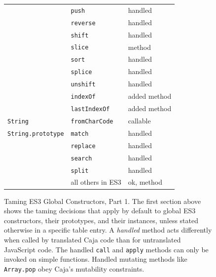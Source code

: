 \documentclass[letterpaper,twocolumn,10pt]{article}
\newcommand{\code}[1]{{\tt {#1}}}              %
\begin{document}
\begin{figure}
\begin{tabular}{lll}
                                 & \code{push}                 & handled \\
                                 & \code{reverse}              & handled \\
                                 & \code{shift}                & handled \\
                                 & \code{slice}                & method \\
                                 & \code{sort}                 & handled \\
                                 & \code{splice}               & handled \\
                                 & \code{unshift}              & handled \\
                                 & \code{indexOf}              & added method \\
                                 & \code{lastIndexOf}          & added method \\
  \hline
  \code{String}                  & \code{fromCharCode}         & callable \\
  \code{String.prototype}        & \code{match}                & handled \\
                                 & \code{replace}              & handled \\
                                 & \code{search}               & handled \\
                                 & \code{split}                & handled \\
                                 &           all others in ES3 & ok, method \\
\end{tabular}

\caption[Taming ES3 Global Constructors, Part 1.]{Taming ES3 Global 
Constructors, Part 1. The first section above shows the taming decisions that 
apply by default to global ES3 constructors, their prototypes, and their 
instances, unless stated otherwise in a specific table entry. A 
\emph{handled} method acts differently when called by translated Caja code 
than for untranslated JavaScript code. The handled \code{call} and 
\code{apply} methods can only be invoked on simple functions. Handled 
mutating methods like \code{Array.pop} obey Caja's mutability constraints. }
\label{tab:taming-es3-1}
\end{figure}
\end{document}
